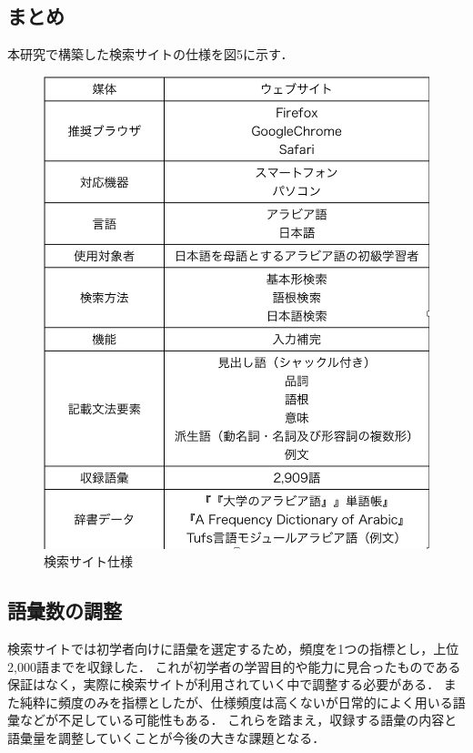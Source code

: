 \documentclass[technicalreport]{ieicej}
\begin{document}
\subsection{まとめ}
本研究で構築した検索サイトの仕様を図5に示す．
\begin{figure}[H]
\begin{center}
\includegraphics[scale=0.4]{fig05.png}
\caption{検索サイト仕様}
\end{center}
\end{figure}


\subsection{語彙数の調整}
検索サイトでは初学者向けに語彙を選定するため，頻度を1つの指標とし，上位2,000語までを収録した．
これが初学者の学習目的や能力に見合ったものである保証はなく，実際に検索サイトが利用されていく中で調整する必要がある．
また純粋に頻度のみを指標としたが、仕様頻度は高くないが日常的によく用いる語彙などが不足している可能性もある．
これらを踏まえ，収録する語彙の内容と語彙量を調整していくことが今後の大きな課題となる．
\end{document}
